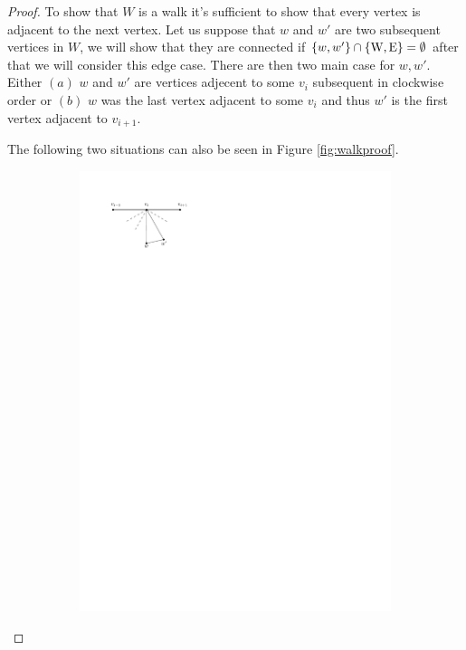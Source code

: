 \begin{proof}
To show that $W$ is a walk it's sufficient to show that every vertex is adjacent to the next vertex. Let us suppose that $w$ and $w'$ are two subsequent vertices in $W$, we will show that they are connected if $\left\lbrace {w, w'} \right\rbrace \cap \left\lbrace {\mathrm{W}, \mathrm{E}} \right\rbrace = \emptyset$ after that we will consider this edge case. There are then two main case for $w, w'$. Either $(a)$ $w$ and $w'$ are  vertices adjecent to some $v_i$ subsequent in clockwise order or $(b)$ $w$ was the last vertex adjacent to some $v_i$ and thus $w'$ is the first vertex adjacent to $v_{i+1}$.

The following two situations can also be seen in Figure \ref{fig:walkproof}.

\begin{figure}
    \centering
    \begin{subfigure}[b]{0.5\linewidth}
        \includegraphics[width=\linewidth]{redAlgo/img/walkProofA}

\end{subfigure}
\end{figure}
\end{proof}
